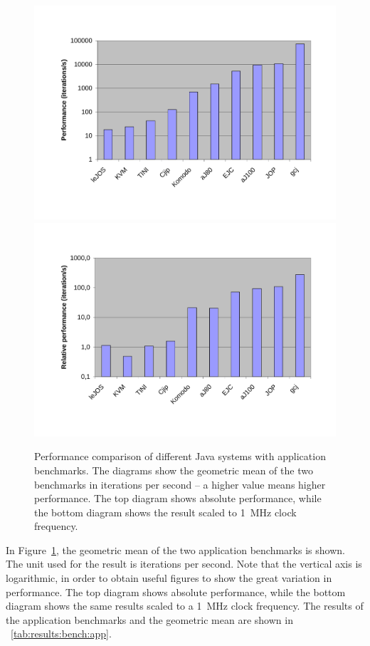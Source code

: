 \begin{figure}
    \centering
    \includegraphics[width=\excelwidth]{results/results_app_bench}
    \\
    \vspace{0.5cm}
    \includegraphics[width=\excelwidth]{results/results_app_bench_scaled}
    \caption{Performance comparison of different Java systems with
    application benchmarks. The diagrams show the geometric mean
    of the two benchmarks in iterations per second -- a higher
    value means higher performance. The top diagram shows
    absolute performance, while the bottom diagram shows the result
    scaled to 1~MHz clock frequency.
    }
    \label{fig:results:app:bench}
\end{figure}


In Figure~\ref{fig:results:app:bench}, the geometric mean of the two
application benchmarks is shown. The unit used for the result is
iterations per second. Note that the vertical axis is logarithmic,
in order to obtain useful figures to show the great variation in
performance. The top diagram shows absolute performance, while the
bottom diagram shows the same results scaled to a 1~MHz clock
frequency. The results of the application benchmarks and the
geometric mean are shown in \tablename~\ref{tab:results:bench:app}.


